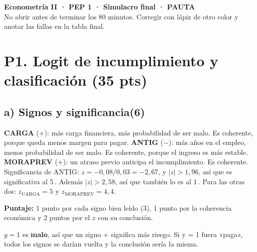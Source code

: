 \documentclass[11pt,a4paper]{article}
\newcommand{\sub}[2]{\subsection*{#1\hfill{\normalsize\textbf{(#2)}}}}
\begin{document}
\renewcommand{\%}{\ifmmode\mbox{\char37}\else\char37\fi}

\begin{center}
{\Large\bfseries Econometría II · PEP 1 · Simulacro final · \textcolor{red!60!black}{PAUTA}}\\[3pt]
No abrir antes de terminar los 80 minutos. Corregir con lápiz de otro color y anotar las fallas en la tabla final.
\end{center}

\section*{P1. Logit de incumplimiento y clasificación (35 pts)}

\sub{a) Signos y significancia}{6}
\begin{ejemplar}
\textbf{CARGA} ($+$): más carga financiera, más probabilidad de ser malo. Es coherente, porque queda menos margen para pagar.
\textbf{ANTIG} ($-$): más años en el empleo, menos probabilidad de ser malo. Es coherente, porque el ingreso es más estable.
\textbf{MORAPREV} ($+$): un atraso previo anticipa el incumplimiento. Es coherente.\\
Significancia de ANTIG: $z=-0{,}08/0{,}03=-2{,}67$, y $|z|>1{,}96$, así que es significativa al 5\,\%. Además $|z|>2{,}58$, así que también lo es al 1\,\%. Para las otras dos: $z_{\text{CARGA}}=5$ y $z_{\text{MORAPREV}}=4{,}4$.
\end{ejemplar}
\textbf{Puntaje:} 1 punto por cada signo bien leído (3), 1 punto por la coherencia económica y 2 puntos por el $z$ con su conclusión.
\begin{trampa}
$y=1$ es \textbf{malo}, así que un signo $+$ significa más riesgo. Si y = 1 fuera «paga», todos los signos se darían vuelta y la conclusión sería la misma.
\end{trampa}
\end{document}
